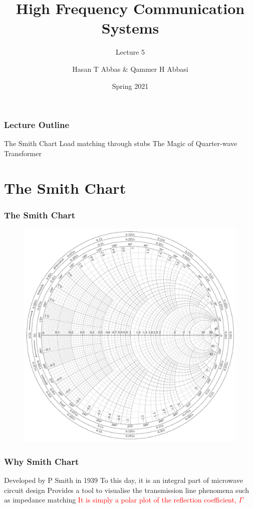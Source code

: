 \documentclass[10pt, compress]{beamer}
\title{High Frequency Communication Systems}
\subtitle{Lecture 5}
\date{Spring 2021}
\author{Hasan T Abbas \& Qammer H Abbasi}
\begin{document}
\maketitle

\begin{frame}[fragile]
    \frametitle{Lecture Outline}
    \begin{outline}[itemize]
        \1 The Smith Chart
        \1 Load matching through stubs
        \1 The Magic of Quarter-wave Transformer
    \end{outline}
\end{frame}

\section{The Smith Chart}


\begin{frame}
    \frametitle{The Smith Chart}
    \begin{figure}[htbp]
        \centering
        \includegraphics[width=.7\textwidth]{smith.pdf}
    \end{figure}
\end{frame}


\begin{frame}
    \frametitle{Why Smith Chart}
    \begin{outline}
        \1 Developed by P Smith in 1939
        \1 To this day, it is an integral part of microwave circuit design
        \1 Provides a tool to visualise the transmission line phenomena such as impedance matching
        \1 \textcolor{red}{It is simply a polar plot of the reflection coefficient, $\Gamma$}
    \end{outline}
\end{frame}
\end{document}

